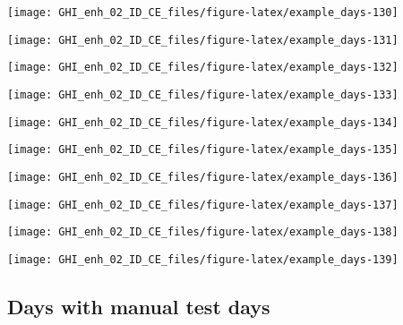 \documentclass[
  10pt,
  a4paper,oneside]{article}
\begin{document}
\begin{center}\texttt{[image: GHI\_enh\_02\_ID\_CE\_files/figure-latex/example\_days-130]} \end{center}

\begin{center}\texttt{[image: GHI\_enh\_02\_ID\_CE\_files/figure-latex/example\_days-131]} \end{center}

\begin{center}\texttt{[image: GHI\_enh\_02\_ID\_CE\_files/figure-latex/example\_days-132]} \end{center}

\begin{center}\texttt{[image: GHI\_enh\_02\_ID\_CE\_files/figure-latex/example\_days-133]} \end{center}

\begin{center}\texttt{[image: GHI\_enh\_02\_ID\_CE\_files/figure-latex/example\_days-134]} \end{center}

\begin{center}\texttt{[image: GHI\_enh\_02\_ID\_CE\_files/figure-latex/example\_days-135]} \end{center}

\begin{center}\texttt{[image: GHI\_enh\_02\_ID\_CE\_files/figure-latex/example\_days-136]} \end{center}

\begin{center}\texttt{[image: GHI\_enh\_02\_ID\_CE\_files/figure-latex/example\_days-137]} \end{center}

\begin{center}\texttt{[image: GHI\_enh\_02\_ID\_CE\_files/figure-latex/example\_days-138]} \end{center}

\begin{center}\texttt{[image: GHI\_enh\_02\_ID\_CE\_files/figure-latex/example\_days-139]} \end{center}

\FloatBarrier

\hypertarget{days-with-manual-test-days}{%
\subsection{Days with manual test days}\label{days-with-manual-test-days}}
\end{document}
